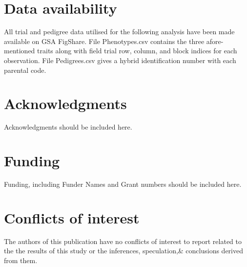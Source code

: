 \section{Data availability}

All trial and pedigree data utilised for the following analysis have been made
available on GSA FigShare. File Phenotypes.csv contains the three afore-
mentioned traits along with field trial row, column, and block indices for each
observation. File Pedigrees.csv gives a hybrid identification number with
each parental code.

\section{Acknowledgments}
Acknowledgments should be included here.

\section{Funding}
Funding, including Funder Names and Grant numbers should be included here.

\section{Conflicts of interest}

The authors of this publication have no conflicts of interest to report related to the the results of this study or the inferences, speculation,\& conclusions derived from them.

